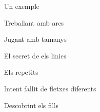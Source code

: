 \documentclass{article}
\begin{document}
Un exemple
\begin{figure}[htbp]
{
	
	\centerline{\box\graph}
}
\end{figure}

Treballant amb arcs
\begin{figure}[htbp]
{
	
	\centerline{\box\graph}
}
\end{figure}

Jugant amb tamanys
\begin{figure}[htbp]
{
	
	\centerline{\box\graph}
}
\end{figure}

\newpage
El secret de els linies
\begin{figure}[htbp]
{
	
	\centerline{\box\graph}
}
\end{figure}

Els repetits
\begin{figure}[htbp]
{
	
	\centerline{\box\graph}
}
\end{figure}

Intent fallit de fletxes diferents
\begin{figure}[htbp]
{
	
	\centerline{\box\graph}
}
\end{figure}

\newpage
Descobrint els fills
\begin{figure}[htbp]
{
	
	\centerline{\box\graph}
}
\end{figure}
\end{document}
